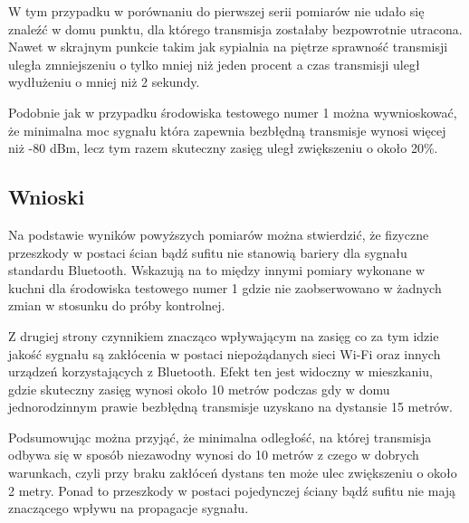\documentclass[12pt, twoside, openany]{mwrep}
\begin{document}
W tym przypadku w porównaniu do pierwszej serii pomiarów nie udało się znaleźć w domu punktu, dla którego transmisja zostałaby bezpowrotnie utracona. Nawet w skrajnym punkcie takim jak sypialnia na piętrze sprawność transmisji uległa zmniejszeniu o tylko mniej niż jeden procent a czas transmisji uległ wydłużeniu o mniej niż 2 sekundy. 
\par
Podobnie jak w przypadku środowiska testowego numer 1 można wywnioskować, że minimalna moc sygnału która zapewnia bezbłędną transmisje wynosi więcej niż -80 dBm, lecz tym razem skuteczny zasięg uległ zwiększeniu o około 20\%. 

\subsection{Wnioski}

Na podstawie wyników powyższych pomiarów można stwierdzić, że fizyczne przeszkody w postaci ścian bądź sufitu nie stanowią bariery dla sygnału standardu Bluetooth. Wskazują na to między innymi pomiary wykonane w kuchni dla środowiska testowego numer 1 gdzie nie zaobserwowano w żadnych zmian w stosunku do próby kontrolnej.
\par
Z drugiej strony czynnikiem znacząco wpływającym na zasięg co za tym idzie jakość sygnału są zakłócenia w postaci niepożądanych sieci Wi-Fi oraz innych urządzeń korzystających z Bluetooth. Efekt ten jest widoczny w mieszkaniu, gdzie skuteczny zasięg wynosi około 10 metrów podczas gdy w domu jednorodzinnym prawie bezbłędną transmisje uzyskano na dystansie 15 metrów. 
\par
Podsumowując można przyjąć, że minimalna odległość, na której transmisja odbywa się w sposób niezawodny wynosi do 10 metrów z czego w dobrych warunkach, czyli przy braku zakłóceń dystans ten może ulec zwiększeniu o około 2 metry. Ponad to przeszkody w postaci pojedynczej ściany bądź sufitu nie mają znaczącego wpływu na propagacje sygnału.


\end{document}

